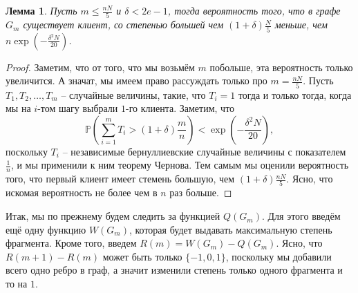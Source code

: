 \documentclass{matmex-diploma-custom}
\newcommand{\PRob}{\mathbb P}
\newcommand{\leqs}{\leqslant}
\newtheorem{lemma}{Лемма}
\theoremstyle{named}
\begin{document}
\begin{lemma}\label{l4}
Пусть $m \leqs \frac{nN}{5}$ и $\delta < 2e - 1$, тогда вероятность того, что в графе $G_m$ существует клиент, 
со степенью большей чем $(1+\delta)\frac{N}{5}$ меньше, чем $n \exp\left(- \frac{\delta^2 N}{20}\right)$.
\end{lemma}
\begin{proof}
Заметим, что от того, что мы возьмём $m$ побольше, эта вероятность только увеличится. 
А значат, мы имеем право рассуждать только про $m = \frac{nN}{5}$. 
Пусть $T_1, T_2, \dots, T_m$ -- случайные величины, такие, что $T_i = 1$ тогда и только тогда, 
когда мы на $i$-том шагу выбрали $1$-го клиента.
Заметим, что 
\begin{equation}
\PRob\left(\sum_{i = 1}^m T_i > (1+\delta)\frac{m}{n} \right) < \exp\left(- \frac{\delta^2 N}{20} \right),
\end{equation}
поскольку $T_i$ -- независимые бернуллиевские случайные величины с показателем $\frac{1}{n}$, и мы применили к ним теорему Чернова.
Тем самым мы оценили вероятность того, что первый клиент имеет стемень большую, чем $(1+\delta)\frac{nN}{5}$.
Ясно, что искомая вероятность не более чем в $n$ раз больше.
\end{proof}

Итак, мы по прежнему будем следить за функцией $Q(G_m)$. Для этого введём ещё одну функцию $W(G_m)$, 
которая будет выдавать максимальную степень фрагмента.
Кроме того, введем $R(m) = W(G_m) - Q(G_m)$. 
Ясно, что $R(m+1) - R(m)$ может быть только $\{-1,0,1\}$, поскольку мы добавили всего одно ребро в граф, 
а значит изменили степень только одного фрагмента и то на $1$. 
\end{document}
